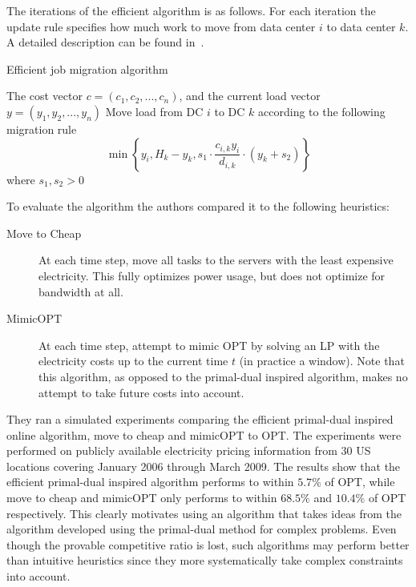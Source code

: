 The iterations of the efficient algorithm is as follows. For each iteration the update rule specifies how much work to move from data center $i$ to data center $k$. A detailed description can be found in~\cite{buchbinder11:job-migration-techreport}.

\begin{algorithm}
\caption{Efficient job migration algorithm}
\label{job-migration-alg}
\begin{algorithmic}[1]
\REQUIRE The cost vector $c=(c_1,c_2,...,c_n)$, and the current load vector $y=(y_1,y_2,...,y_n)$
  \STATE Move load from DC $i$ to DC $k$ according to the following migration rule 
   \[ 
    \min \left\{ y_i, H_k - y_{k}, s_1 \cdot \frac{c_{i,k}y_i}{d_{i,k}} \cdot (y_k + s_2) \right\}
   \]
   where $s_1,s_2 > 0$
 \ENDFOR
\ENDFOR
\end{algorithmic}
\end{algorithm}

To evaluate the algorithm the authors compared it to the following heuristics:
\begin{description}
 \item[Move to Cheap] At each time step, move all tasks to the servers with the least expensive electricity. This fully optimizes power usage, but does not optimize for bandwidth at all.
 \item[MimicOPT] At each time step, attempt to mimic OPT by solving an LP with the electricity costs up to the current time $t$ (in practice a window). Note that this algorithm, as opposed to the primal-dual inspired algorithm, makes no attempt to take future costs into account.
\end{description}

They ran a simulated experiments comparing the efficient primal-dual inspired online algorithm, move to cheap and mimicOPT to OPT.
The experiments were performed on publicly available electricity pricing information from 30 US locations covering January 2006 through March 2009.
The results show that the efficient primal-dual inspired algorithm  performs to within $5.7\%$ of OPT, while move to cheap and mimicOPT only performs to within $68.5\%$ and $10.4\%$ of OPT respectively.
This clearly motivates using an algorithm that takes ideas from the algorithm developed using the primal-dual method for complex problems. 
Even though the provable competitive ratio is lost, such algorithms may perform better than intuitive heuristics since they more systematically take complex constraints into account.
